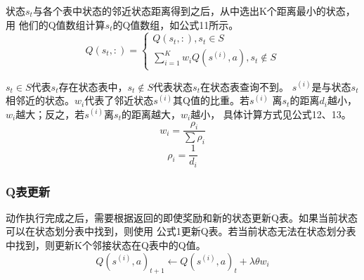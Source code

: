 \documentclass[twocolumn]{article}
\begin{document}
状态$s_{t}$与各个表中状态的邻近状态距离得到之后，从中选出K个距离最小的状态，用
他们的Q值数组计算$s_{t}$的Q值数组，如公式11所示。
\begin{equation}
Q(s_{t},:)=\left\{
\begin{array}{lr}
    Q(s_{t},:),s_{t}\in S\\
    \sum_{i=1}^K w_{i}Q(s^{(i)},a),s_{t}\notin S 
\end{array}
\right.
\end{equation}

$s_{t}\in S$代表$s_{t}$存在状态表中，$s_{t}\notin S$代表状态$s_{t}$在状态表查询不到。
$s^{(i)}$是与状态$s_{t}$相邻近的状态。$w_i$代表了邻近状态$s^{(i)}$其Q值的比重。若$s^{(i)}$
离$s_{t}$的距离$d_i$越小，$w_i$越大；反之，若$s^{(i)}$离$s_{t}$的距离越大，$w_i$越小，
具体计算方式见公式12、13。
\begin{equation}
w_{i}=\frac{\rho _{i}}{\sum\rho_{i}}
\end{equation}
\begin{equation}
\rho_{i}=\frac{1}{d_{i}}
\end{equation}
\subsubsection{Q表更新}
动作执行完成之后，需要根据返回的即使奖励和新的状态更新Q表。如果当前状态可以在状态划分表中找到，则使用
公式1更新Q表。若当前状态无法在状态划分表中找到，则更新K个邻接状态在Q表中的Q值。
\begin{equation}
Q(s^{(i)},a)_{t+1}\leftarrow Q(s^{(i)},a)_{t}+\lambda\theta w_{i}
\end{equation}
\end{document}
